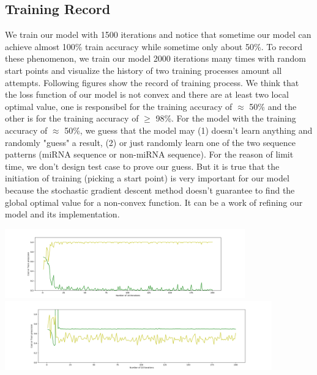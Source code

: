 \documentclass[letterpaper, 11pt]{article}
\newenvironment{Figure}
  {\par\medskip\noindent\minipage{\linewidth}}
  {\endminipage\par\medskip}
\begin{document}
\begin{multicols*}{2}
{\subsection{Training Record}
We train our model with 1500 iterations and notice that sometime our model can achieve almost 100\% train accuracy while sometime only about 50\%. To record these phenomenon, we train our model 2000 iterations many times with random start points and visualize the history of two training processes amount all attempts. Following figures show the record of training process. We think that the loss function of our model is not convex and there are at least two local optimal value, one is responsibel for the training accuracy of $\approx$ 50\% and the other is for the training accuracy of $\geq$ 98\%. For the model with the training accuracy of $\approx$ 50\%, we guess that the model may (1) doesn't learn anything and randomly "guess" a result, (2) or just randomly learn one of the two sequence patterns (miRNA sequence or non-miRNA sequence). For the reason of limit time, we don't design test case to prove our guess. But it is true that the initiation of training (picking a start point) is very important for our model because the stochastic gradient descent method doesn't guarantee to find the global optimal value for a non-convex function. It can be a work of refining our model and its implementation. 
\begin{Figure}
\includegraphics[height = 3cm, width = \textwidth]{correct.png}
\vspace{2mm}
\includegraphics[height = 3cm, width = \textwidth]{incorrect.png}
\end{Figure}


}
\end{multicols*}
\end{document}
